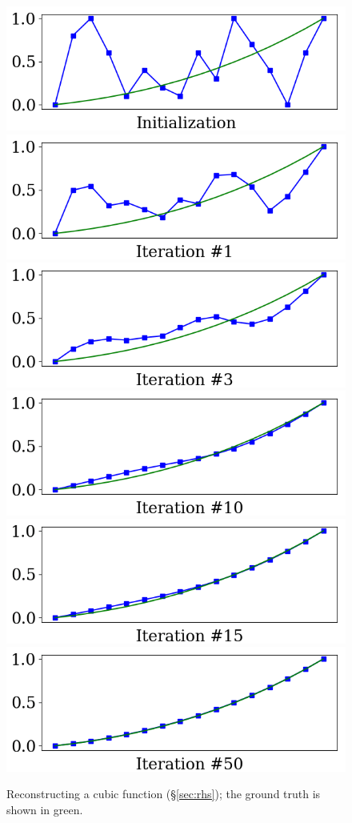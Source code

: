 \documentclass[notitlepage]{report}
\begin{document}
\inputminted[frame=single,linenos=true]{python}{listings/example_3.3.py}
\begin{figure}[ht]
    \centering
    \includegraphics[width=.32\linewidth]{example_3.3_0.png}
    \includegraphics[width=.32\linewidth]{example_3.3_1.png}
    \includegraphics[width=.32\linewidth]{example_3.3_2.png}
    \includegraphics[width=.32\linewidth]{example_3.3_3.png}
    \includegraphics[width=.32\linewidth]{example_3.3_4.png}
    \includegraphics[width=.32\linewidth]{example_3.3_5.png}
    \caption{Reconstructing a cubic function (\S\ref{sec:rhs}); the ground truth is shown in green.}
    \label{fig:linsys_smooth_constrain}
\end{figure}



\end{document}
